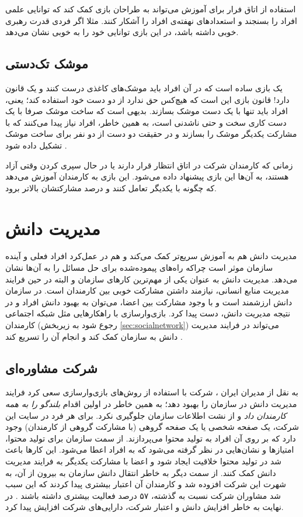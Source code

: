 استفاده از اتاق فرار برای آموزش می‌تواند به طراحان بازی کمک کند که توانایی علمی افراد را بسنجند و استعدادهای نهفته‌ی افراد را آشکار کنند. مثلا اگر فردی قدرت رهبری خوبی داشته باشد، در این بازی توانایی خود را به خوبی نشان می‌دهد.
\subsection{موشک تک‌دستی}
یک بازی ساده است که در آن افراد باید موشک‌های کاغذی درست کنند و یک قانون دارد! قانون بازی این است که هیچ‌کس حق ندارد از دو دست خود استفاده کند؛ یعنی، افراد باید تنها با یک دست موشک بسازند. بدیهی است که ساخت موشک صرفا با یک دست کاری سخت و حتی ناشدنی است، به همین خاطر، افراد نیاز پیدا می‌کنند که با مشارکت یکدیگر موشک را بسازند و در حقیقت دو دست از دو نفر برای ساخت موشک تشکیل داده شود \cite{tedx}.

زمانی که کارمندان شرکت در اتاق انتظار قرار دارند یا در حال سپری کردن وقتی آزاد هستند، به آن‌ها این بازی پیشنهاد داده می‌شود. این بازی به کارمندان آموزش می‌دهد که چگونه با یکدیگر تعامل کنند و درصد مشارکتشان بالاتر برود.
\section{مدیریت دانش}
مدیریت دانش هم به آموزش سریع‌تر کمک می‌کند و هم در عمل‌کرد افراد فعلی و آینده سازمان موثر است چراکه راه‌های پیموده‌شده برای حل مسائل را به آن‌ها نشان می‌دهد. مدیریت دانش به عنوان یکی از مهم‌ترین کارهای سازمان و البته در حین فرایند مدیریت منابع انسانی، نیازمند داشتن مشارکت خوبی بین کارمندان است. در سازمان دانش ارزشمند است \cite{kmanagement} و با وجود مشارکت بین اعضا، می‌توان به بهبود دانش افراد و در نتیجه مدیریت دانش، دست پیدا کرد. بازی‌وارسازی با راهکارهایی مثل شبکه اجتماعی کارمندان (رجوع شود به زیربخش \ref{sec:socialnetwork}) می‌تواند در فرایند مدیریت دانش به سازمان کمک کند و انجام آن را تسریع کند \cite{amiriamin}.
\subsection{شرکت مشاوره‌ای }
به نقل از مدیران ایران \cite{modiran}، شرکت  با استفاده از روش‌های بازی‌وارسازی سعی کرد فرایند مدیریت دانش در سازمان را بهبود دهد؛ به همین خاطر در اولین اقدام \emph{بلندگو را به همه کارمندان داد} و از نشت اطلاعات سازمان جلوگیری نکرد. برای هر فرد در سایت این شرکت، یک صفحه شخصی یا یک صفحه گروهی (با مشارکت گروهی از کارمندان) وجود دارد که بر روی آن افراد به تولید محتوا می‌پردازند. از سمت سازمان برای تولید محتوا، امتیازها و نشان‌هایی در نظر گرفته می‌شود که به افراد اعطا می‌شود. این کارها باعث شد در تولید محتوا خلاقیت ایجاد شود و اعضا با مشارکت یکدیگر به فرایند مدیریت دانش کمک کنند. از سمت دیگر به خاطر انتقال دانش سازمان به بیرون از آن، به شهرت این شرکت افزوده شد و کارمندان آن اعتبار بیشتری پیدا کردند که این سبب شد مشاوران شرکت نسبت به گذشته، ۵۷ درصد فعالیت بیشتری داشته باشند \cite{bluewolf}. در نهایت به خاطر افزایش دانش و اعتبار شرکت، دارایی‌های شرکت افزایش پیدا کرد.

